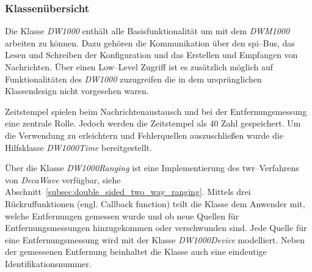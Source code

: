 

\begin{comment}
------------------------------------------------------------------------------------------
- Klassendiagramme der wichtigsten Elemente
	- Auswelchen wichtigen Elementen besteht diese Bibliothek?
	- DW1000
	- DW1000Time
	- DW1000Device
	- DW1000Ranging
- Die Steuersoftware besteht aus den Klassen \textit{DW1000}, \textit{DW1000Time}, \textit{DW1000Ranging}, \textit{DW1000Device} die im folgenden Beschrieben werden.
\end{comment}
\subsubsection{Klassenübersicht}

Die Klasse \textit{DW1000} enthält alle Basisfunktionalität um mit dem \textit{DWM1000} arbeiten zu können. Dazu gehören die Kommunikation über den \Gls{spi}--Bus, das Lesen und Schreiben der Konfiguration und das Erstellen und Empfangen von Nachrichten. Über einen Low--Level Zugriff ist es zusätzlich möglich auf Funktionalitäten des \textit{DW1000} zuzugreifen die in dem ursprünglichen Klassendesign nicht vorgesehen waren.

Zeitstempel spielen beim Nachrichtenaustausch und bei der Entfernungsmessung eine zentrale Rolle. Jedoch werden die Zeitstempel als \SI{40}{\bit} Zahl gespeichert. Um die Verwendung zu erleichtern und Fehlerquellen auszuschließen wurde die Hilfsklasse \textit{DW1000Time} bereitgestellt.

Über die Klasse \textit{DW1000Ranging} ist eine Implementierung des \Gls{twr}--Verfahrens von \textit{DecaWave} verfügbar, siehe Abschnitt~\ref{subsec:double_sided_two_way_ranging}. Mittels drei Rückruffunktionen (engl. Callback function) teilt die Klasse dem Anwender mit, welche Entfernungen gemessen wurde und ob neue Quellen für Entfernungsmessungen hinzugekommen oder verschwunden sind. Jede Quelle für eine Entfernungsmessung wird mit der Klasse \textit{DW1000Device} modelliert. Neben der gemessenen Entfernung beinhaltet die Klasse auch eine eindeutige Identifikationsnummer. 


\begin{comment}
------------------------------------------------------------------------------------------
- Basisscript
	- Wie sieht ein ganz triviales Beispiel aus?
	- Wie ist der Programmablauf des Beispiels?
	- Für das DW1000Ranging
	- Wie kann man Daten austauschen? JSON
- Datenaustausch zwischen Host und µC
- ArduinoJson Assistant
	- https://arduinojson.org/assistant/
\end{comment}
